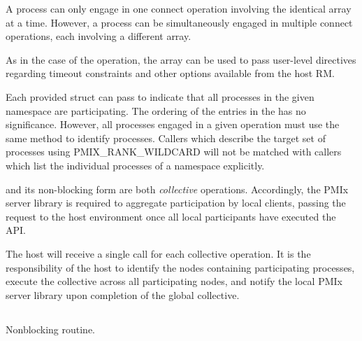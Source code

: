 A process can only engage in one connect operation involving the identical  array at a time.
However, a process can be simultaneously engaged in multiple connect operations, each involving a different  array.

As in the case of the  operation, the  array can be used to pass user-level directives regarding timeout constraints and other options available from the host \ac{RM}.

Each provided  struct can pass  to indicate that all processes in the given namespace are participating.
The ordering of the entries in the  has no significance.  However, all processes engaged in a given
operation must use the same method to identify processes.  Callers which describe
the target set of processes using PMIX_RANK_WILDCARD will not be matched with
callers which list the individual processes of a namespace explicitly.

\adviceimplstart
{} and its non-blocking form are both \emph{collective} operations. Accordingly, the \ac{PMIx} server library is required to aggregate participation by local clients, passing the request to the host environment once all local participants have executed the \ac{API}.
\adviceimplend

\advicermstart
The host will receive a single call for each collective operation. It is the responsibility of the host to identify the nodes containing participating processes, execute the collective across all participating nodes, and notify the local \ac{PMIx} server library upon completion of the global collective.
\advicermend


\subsection{}

\summary

Nonblocking  routine.

\format


